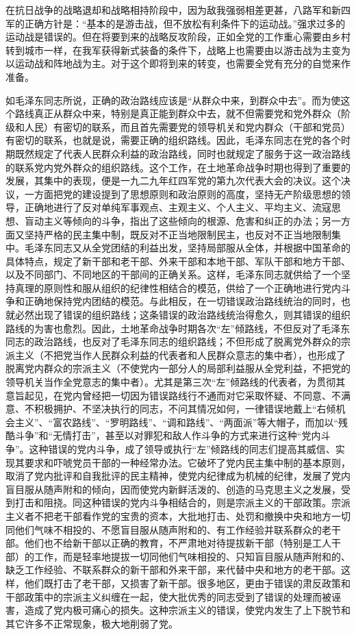 在抗日战争的战略退却和战略相持阶段中，因为敌我强弱相差更甚，八路军和新四军的正确方针是：“基本的是游击战，但不放松有利条件下的运动战。”强求过多的运动战是错误的。但在将要到来的战略反攻阶段，正如全党的工作重心需要由乡村转到城市一样，在我军获得新式装备的条件下，战略上也需要由以游击战为主变为以运动战和阵地战为主。对于这个即将到来的转变，也需要全党有充分的自觉来作准备。


如毛泽东同志所说，正确的政治路线应该是“从群众中来，到群众中去”。而为使这个路线真正从群众中来，特别是真正能到群众中去，就不但需要党和党外群众（阶级和人民）有密切的联系，而且首先需要党的领导机关和党内群众（干部和党员）有密切的联系，也就是说，需要正确的组织路线。因此，毛泽东同志在党的各个时期既然规定了代表人民群众利益的政治路线，同时也就规定了服务于这一政治路线的联系党内党外群众的组织路线。这个工作，在土地革命战争时期也得到了重要的发展，其集中的表现，便是一九二九年红四军党的第九次代表大会的决议。这个决议，一方面把党的建设提到了思想原则和政治原则的高度，坚持无产阶级思想的领导，正确地进行了反对单纯军事观点、主观主义、个人主义、平均主义、流寇思想、盲动主义等倾向的斗争，指出了这些倾向的根源、危害和纠正的办法；另一方面又坚持严格的民主集中制，既反对不正当地限制民主，也反对不正当地限制集中。毛泽东同志又从全党团结的利益出发，坚持局部服从全体，并根据中国革命的具体特点，规定了新干部和老干部、外来干部和本地干部、军队干部和地方干部、以及不同部门、不同地区的干部间的正确关系。这样，毛泽东同志就供给了一个坚持真理的原则性和服从组织的纪律性相结合的模范，供给了一个正确地进行党内斗争和正确地保持党内团结的模范。与此相反，在一切错误政治路线统治的同时，也就必然出现了错误的组织路线；这条错误的政治路线统治得愈久，则其错误的组织路线的为害也愈烈。因此，土地革命战争时期各次“左”倾路线，不但反对了毛泽东同志的政治路线，也反对了毛泽东同志的组织路线；不但形成了脱离党外群众的宗派主义（不把党当作人民群众利益的代表者和人民群众意志的集中者），也形成了脱离党内群众的宗派主义（不使党内一部分人的局部利益服从全党利益，不把党的领导机关当作全党意志的集中者）。尤其是第三次“左”倾路线的代表者，为贯彻其意旨起见，在党内曾经把一切因为错误路线行不通而对它采取怀疑、不同意、不满意、不积极拥护、不坚决执行的同志，不问其情况如何，一律错误地戴上“右倾机会主义”、“富农路线”、“罗明路线”、“调和路线”、“两面派”等大帽子，而加以“残酷斗争”和“无情打击”，甚至以对罪犯和敌人作斗争的方式来进行这种“党内斗争”。这种错误的党内斗争，成了领导或执行“左”倾路线的同志们提高其威信、实现其要求和吓唬党员干部的一种经常办法。它破坏了党内民主集中制的基本原则，取消了党内批评和自我批评的民主精神，使党内纪律成为机械的纪律，发展了党内盲目服从随声附和的倾向，因而使党内新鲜活泼的、创造的马克思主义之发展，受到打击和阻挠。同这种错误的党内斗争相结合的，则是宗派主义的干部政策。宗派主义者不把老干部看作党的宝贵的资本，大批地打击、处罚和撤换中央和地方一切同他们气味不相投的、不愿盲目服从随声附和的、有工作经验并联系群众的老干部。他们也不给新干部以正确的教育，不严肃地对待提拔新干部（特别是工人干部）的工作，而是轻率地提拔一切同他们气味相投的、只知盲目服从随声附和的、缺乏工作经验、不联系群众的新干部和外来干部，来代替中央和地方的老干部。这样，他们既打击了老干部，又损害了新干部。很多地区，更由于错误的肃反政策和干部政策中的宗派主义纠缠在一起，使大批优秀的同志受到了错误的处理而被诬害，造成了党内极可痛心的损失。这种宗派主义的错误，使党内发生了上下脱节和其它许多不正常现象，极大地削弱了党。

